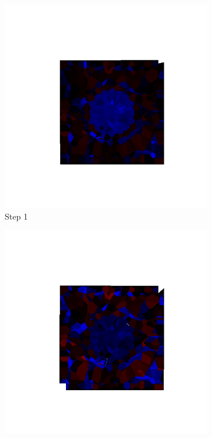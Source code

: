   \begin{figure}[ht!]
  \centering
      \begin{subfigure}{.25\textwidth}
        \centering
        \includegraphics[width=1.0\linewidth]{Files/Small_DEF/IS/DEP5-STEP(001).png}
      \caption{Step 1}
      \end{subfigure}%
      \begin{subfigure}{.25\textwidth}
        \centering
        \includegraphics[width=1.0\linewidth]{Files/Small_DEF/IS/DEP5-STEP(002).png}

\end{subfigure}
\end{figure}
